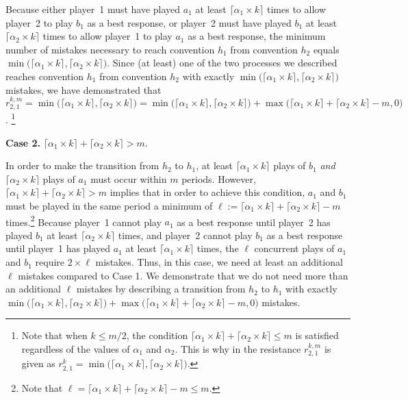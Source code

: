 \documentclass[11.5pt]{article}
\begin{document}
Because either player~1 must have played $a_1$ at least $\lceil \alpha_1 \times k \rceil$ times to allow player~2 to play $b_1$ as a best response, or player~2 must have played $b_1$ at least $\lceil \alpha_2 \times k \rceil$ times to allow player~1 to play $a_1$ as a best response, the minimum number of mistakes necessary to reach convention $h_1$ from convention $h_2$ equals $\min\big(\lceil \alpha_1 \times k \rceil,\lceil \alpha_2 \times k \rceil\big)$. Since (at least) one of the two processes we described reaches convention $h_1$ from convention $h_2$ with exactly $\min\big(\lceil \alpha_1 \times k \rceil,\lceil \alpha_2 \times k \rceil\big)$ mistakes, we have demonstrated that 
$r_{2,1}^{k,m} =  \min\big(\lceil \alpha_1 \times k \rceil,\lceil \alpha_2 \times k \rceil\big) = \min\big(\lceil \alpha_1 \times k \rceil,\lceil \alpha_2 \times k \rceil\big)+\max\big(\lceil\alpha_1\times k\rceil+\lceil \alpha_2 \times k \rceil-m,0\big)$.%
\footnote{Note that when $k \leq m/2$, the condition $\lceil \alpha_1 \times k \rceil + \lceil \alpha_2 \times k \rceil \leq m$ is satisfied regardless of the values of $\alpha_1$ and $\alpha_2$. This  is why in \cite{Young1998} the resistance $r_{2,1}^{k,m}$ is given as $r_{2,1}^{k} = \min\big(\lceil \alpha_1 \times k \rceil, \lceil \alpha_2 \times k \rceil\big)$.%
} 


{\bf Case 2.} $\lceil \alpha_1 \times k \rceil + \lceil \alpha_2 \times k \rceil > m$. 

In order to make the transition from $h_2$ to $h_1$, at least $\lceil \alpha_1 \times k \rceil$ plays of $b_1$ \emph{and} $\lceil \alpha_2 \times k \rceil$ plays of $a_1$ must occur within $m$ periods.
However, $\lceil \alpha_1 \times k \rceil + \lceil \alpha_2 \times k \rceil > m$ implies that in order to achieve this condition, $a_1$ and $b_1$ must be played in the same period a minimum of $\ell:= \lceil \alpha_1 \times k \rceil+\lceil \alpha_2 \times k \rceil-m$ times.\footnote{Note that $\ell= \lceil \alpha_1 \times k \rceil+\lceil \alpha_2 \times k \rceil-m\leq m$.}
%
Because player~1 cannot play $a_1$ as a best response until player~2 has played $b_1$ at least $\lceil \alpha_2 \times k \rceil$ times, and player~2 cannot play $b_1$ as a best response until player~1 has played $a_1$ at least $\lceil \alpha_1 \times k \rceil$ times, the $\ell$ concurrent plays of $a_1$ and $b_1$ require $2\times \ell$ mistakes. Thus, in this case, we need at least an additional $\ell$ mistakes compared to Case 1. We demonstrate that we do not need more than an additional $\ell$ mistakes by describing a transition from $h_2$ to $h_1$ with exactly $\min\big(\lceil \alpha_1 \times k \rceil,\lceil \alpha_2 \times k \rceil\big) + \max\big(\lceil\alpha_1\times k\rceil+\lceil \alpha_2 \times k \rceil-m,0\big)$ mistakes. 
\end{document}
